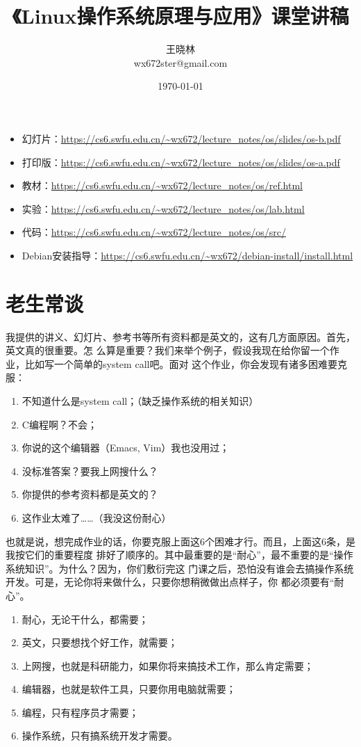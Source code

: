 \documentclass{wx672ctexart}
\author{王晓林\\{\ttfamily wx672ster@gmail.com}}
\date{\today}
\title{《Linux操作系统原理与应用》课堂讲稿}
\begin{document}
\maketitle
\tableofcontents

\begin{itemize}
\item 幻灯片：\url{https://cs6.swfu.edu.cn/\~wx672/lecture\_notes/os/slides/os-b.pdf}
\item 打印版：\url{https://cs6.swfu.edu.cn/\~wx672/lecture\_notes/os/slides/os-a.pdf}
\item 教材：\url{https://cs6.swfu.edu.cn/\~wx672/lecture\_notes/os/ref.html}
\item 实验：\url{https://cs6.swfu.edu.cn/\~wx672/lecture\_notes/os/lab.html}
\item 代码：\url{https://cs6.swfu.edu.cn/\~wx672/lecture\_notes/os/src/}
\item Debian安装指导：\url{https://cs6.swfu.edu.cn/\~wx672/debian-install/install.html}
\end{itemize}
\clearpage
\section{老生常谈}
\label{sec:orgaeba803}

我提供的讲义、幻灯片、参考书等所有资料都是英文的，这有几方面原因。首先，英文真的很重要。怎
么算是重要？我们来举个例子，假设我现在给你留一个作业，比如写一个简单的system call吧。面对
这个作业，你会发现有诸多困难要克服：
\begin{enumerate}
\item 不知道什么是system call；（缺乏操作系统的相关知识）
\item C编程啊？不会；
\item 你说的这个编辑器（Emacs, Vim）我也没用过；
\item 没标准答案？要我上网搜什么？
\item 你提供的参考资料都是英文的？
\item 这作业太难了……（我没这份耐心）
\end{enumerate}

也就是说，想完成作业的话，你要克服上面这6个困难才行。而且，上面这6条，是我按它们的重要程度
排好了顺序的。其中最重要的是“耐心”，最不重要的是“操作系统知识”。为什么？因为，你们敷衍完这
门课之后，恐怕没有谁会去搞操作系统开发。可是，无论你将来做什么，只要你想稍微做出点样子，你
都必须要有“耐心”。
\begin{enumerate}
\item 耐心，无论干什么，都需要；
\item 英文，只要想找个好工作，就需要；
\item 上网搜，也就是科研能力，如果你将来搞技术工作，那么肯定需要；
\item 编辑器，也就是软件工具，只要你用电脑就需要；
\item 编程，只有程序员才需要；
\item 操作系统，只有搞系统开发才需要。
\end{enumerate}
\end{document}

